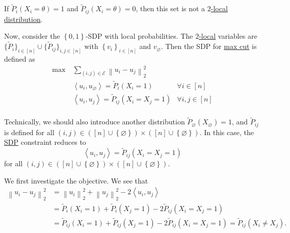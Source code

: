 \begin{eg}
	If \(\widetilde{P} _i (X_i = \theta ) = 1\) and \(\widetilde{P} _{ij}(X_i = \theta ) = 0\), then this set is not a \hyperref[def:2-local-distribution]{\(2\)-local distribution}.
\end{eg}

Now, consider the \(\left\{ 0, 1 \right\} \)-SDP with local probabilities. The \hyperref[def:2-local-distribution]{\(2\)-local} variables are \(\{ \widetilde{P} _i \} _{i\in [n]} \cup  \{ \widetilde{P} _{ij} \}_{i, j\in [n]} \) with \(\left\{ v_i \right\} _{i\in [n]}\) and \(v_\varnothing \). Then the SDP for \hyperref[prb:max-cut]{max cut} is defined as
\[
	\begin{aligned}
		\max~ & \sum_{(i, j)\in \mathcal{E} }\left\lVert u_i - u_j\right\rVert _2^2                              \\
		      & \left\langle u_i, u_\varnothing  \right\rangle = \widetilde{P} _i(X_i = 1) & \forall i\in [n]    \\
		      & \left\langle u_i, u_j  \right\rangle = \widetilde{P} _{ij}(X_i = X_j = 1)  & \forall i, j\in [n] \\
	\end{aligned}
\]

\begin{remark}
	Technically, we should also introduce another distribution \(\widetilde{P} _{\varnothing }(X_\varnothing) = 1\), and \(\widetilde{P} _{ij}\) is defined for all \((i, j)\in ([n]\cup \left\{ \varnothing  \right\} )\times ([n]\cup \left\{ \varnothing  \right\} )\). In this case, the \hyperref[def:SDP]{SDP} constraint reduces to
	\[
		\left\langle  u_i, u_j \right\rangle = \widetilde{P} _{ij}(X_{i} = X_{j} =1)
	\]
	for all \((i, j)\in ([n]\cup \left\{ \varnothing  \right\} )\times ([n]\cup \left\{ \varnothing \right\} )\).
\end{remark}

We first investigate the objective. We see that
\[
	\begin{split}
		\left\lVert u_i - u_j\right\rVert _2^2
		 & = \left\lVert u_i\right\rVert _2^2 + \left\lVert u_j\right\rVert _2^2 - 2\left\langle u_{i} , u_{j}  \right\rangle \\
		 & = \widetilde{P} _i(X_i = 1)+ \widetilde{P} _i(X_j = 1) - 2 \widetilde{P} _{ij} ( X_i = X_j = 1)                    \\
		 & = \widetilde{P} _{ij}(X_i = 1)+ \widetilde{P} _{ij}(X_j = 1) - 2 \widetilde{P} _{ij} ( X_i = X_j = 1)
		= \widetilde{P} _{ij} ( X_i \neq X_j).
	\end{split}
\]

